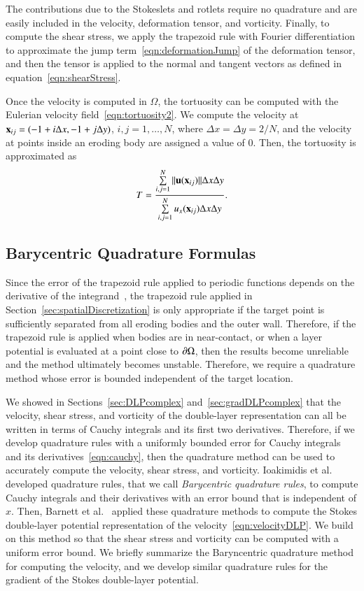 \documentclass[preprint,10pt]{elsarticle}
\begin{document}
The contributions due to the Stokeslets and rotlets require no
quadrature and are easily included in the velocity, deformation tensor,
and vorticity.  Finally, to compute the shear stress, we apply the
trapezoid rule with Fourier differentiation to approximate the jump
term~\eqref{eqn:deformationJump} of the deformation tensor, and then the
tensor is applied to the normal and tangent vectors as defined in
equation~\eqref{eqn:shearStress}.

Once the velocity is computed in $\Omega$, the tortuosity can be
computed with the Eulerian velocity field~\eqref{eqn:tortuosity2}.  We
compute the velocity at ${\mathbf{x}}_{ij} = (-1 + i\Delta x, -1 + j\Delta y)$,
$i,j=1,\ldots,N$, where $\Delta x = \Delta y = 2/N$, and the velocity at
points inside an eroding body are assigned a value of 0.  Then, the
tortuosity is approximated as
\begin{align}
  T = \frac{\sum\limits_{i,j=1}^N \|{\mathbf{u}}({\mathbf{x}}_{ij})\|\Delta x \Delta y}
      {\sum\limits_{i,j=1}^N u_x({\mathbf{x}}_{ij}) \Delta x \Delta y}.
\end{align}

\subsection{Barycentric Quadrature Formulas}
\label{sec:bary}
Since the error of the trapezoid rule applied to periodic functions
depends on the derivative of the integrand~\cite{tre-wei2014}, the
trapezoid rule applied in Section~\ref{sec:spatialDiscretization} is
only appropriate if the target point is sufficiently separated from all
eroding bodies and the outer wall.  Therefore, if the trapezoid rule is
applied when bodies are in near-contact, or when a layer potential is
evaluated at a point close to ${\partial}\Omega$, then the results become
unreliable and the method ultimately becomes unstable.  Therefore, we
require a quadrature method whose error is bounded independent of the
target location.

We showed in Sections~\ref{sec:DLPcomplex} and~\ref{sec:gradDLPcomplex}
that the velocity, shear stress, and vorticity of the double-layer
representation can all be written in terms of Cauchy integrals and its
first two derivatives.  Therefore, if we develop quadrature rules with a
uniformly bounded error for Cauchy integrals and its
derivatives~\eqref{eqn:cauchy}, then the quadrature method can be used
to accurately compute the velocity, shear stress, and vorticity.
Ioakimidis et al.~\cite{ioa-pap-per1991} developed quadrature rules,
that we call {\em Barycentric quadrature rules}, to compute Cauchy
integrals and their derivatives with an error bound that is independent
of $x$.  Then, Barnett et al.~\cite{bar-wu-vee2015} applied these
quadrature methods to compute the Stokes double-layer potential
representation of the velocity~\eqref{eqn:velocityDLP}.  We build on
this method so that the shear stress and vorticity can be computed with
a uniform error bound.  We briefly summarize the Baryncentric quadrature
method for computing the velocity, and we develop similar quadrature
rules for the gradient of the Stokes double-layer potential.
\end{document}

